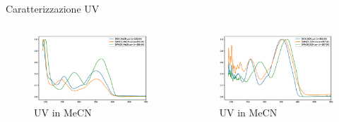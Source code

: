 \documentclass{beamer}
\begin{document}
\begin{frame}{Caratterizzazione UV}
	\vspace{-0.5cm}
	\begin{columns}
		\hspace{-1cm}
		\begin{column}{0.5\textwidth}
			\begin{figure}[h!]
				\centering
				\includegraphics[width=8cm,keepaspectratio]{../Spectra/LegantiMeCN.eps}
				\vspace*{-8mm}
				\hspace*{3cm}
				\caption{UV in MeCN}
			\end{figure}
		\end{column}
		\hspace{-0.5cm}
		\begin{column}{0.5\textwidth}
			\begin{figure}[h!]
				\includegraphics[width=8cm,keepaspectratio]{../Spectra/LegantiDCM.eps}
				\vspace*{-8mm}
				\caption{UV in MeCN}
			\end{figure}
		\end{column}
	\end{columns}
\end{frame}

\backmatter
\end{document}
